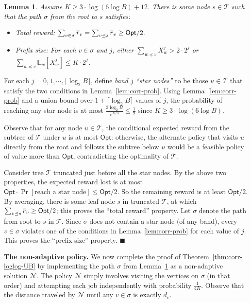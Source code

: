 \documentclass[11pt,letterpaper]{article}
\newtheorem{lemma}[theorem]{Lemma}
\numberwithin{algorithm}{section}
\newenvironment{proof}{

\noindent{\bf Proof:}}
{\hfill$\blacksquare$


}
\newcommand{\N}[0]{{\ensuremath{\mathcal{N}}}\xspace}
\newcommand{\T}{\ensuremath{\mathcal{T}}\xspace}
\newcommand{\Opt}{\ensuremath{\mathsf{Opt}}\xspace}
\newcommand{\E}{\mathbb{E}}
\begin{document}
\begin{lemma}\label{lem:corr-NAfromA}
Assume $K\ge 3\cdot\log(6\log B)+12$. There is some node $s\in \T$ such that the path $\sigma$ from the root to $s$ satisfies:
\begin{itemize}
\item Total reward: $\sum_{v\in \sigma} \rr_v = \sum_{v\preceq s}\rr_v\ge \Opt/2$.
\item Prefix size: For each $v\in\sigma$ and $j$, either $\sum_{w\preceq v} X^j_w > 2\cdot 2^j$ or $\sum_{w\preceq v} \E_w\left[X^j_w\right] \le K\cdot 2^j$.
\end{itemize}
\end{lemma}
\begin{proof}
For each $j=0,1,\cdots,\lceil \log_2B\rceil$, define {\em band $j$ ``star nodes''} to be those $u\in \T$ that satisfy the two conditions in Lemma~\ref{lem:corr-prob}. Using Lemma~\ref{lem:corr-prob} and a union bound over $1+\lceil\log_2B\rceil$ values of $j$, the probability  of reaching any star node is at most $\frac{3\log_2B}{e^{K/3}}\le \frac12$ since $K\ge 3\cdot\log(6\log B)$.

Observe that for any node $u\in \T$, the conditional expected reward from the subtree of \T under $u$ is at most $\Opt$: otherwise, the alternate policy that visits $u$ directly from the root and follows the subtree below $u$ would be a feasible policy of value more than $\Opt$, contradicting the optimality of \T.

Consider tree \T truncated just before all the star nodes. By the above two properties, the expected reward lost is at most $\Opt\cdot \Pr[\mbox{reach a star node}]\le \Opt/2$. So the remaining reward is at least $\Opt/2$. By averaging, there is some leaf node $s$ in truncated \T, at which $\sum_{v\preceq s} \rr_v\ge \Opt/2$; this proves the ``total reward'' property. Let $\sigma$ denote the path from root to $s$ in \T. Since $\sigma$ does not contain a star node (of any band), every $v\in\sigma$  violates one of the conditions in Lemma~\ref{lem:corr-prob} for each value of $j$. This proves the ``prefix size'' property.
\end{proof}

{\bf The non-adaptive policy.} We now complete the proof of Theorem~\ref{thm:corr-loglog-UB} by implementing the path $\sigma$ from Lemma~\ref{lem:corr-NAfromA} as a non-adaptive solution \N. The policy \N simply involves visiting the vertices on $\sigma$ (in that order) and attempting each job independently with probability $\frac{1}{4K}$. Observe that the distance traveled by \N until any $v\in \sigma$ is exactly $d_v$.
\end{document}
